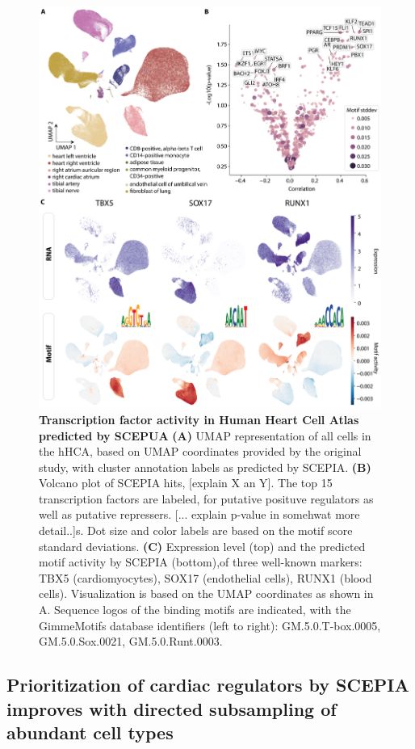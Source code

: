 \begin{figure}
    \centering
    \includegraphics[width=0.75\linewidth]{ch.scepia/imgs/SCEPIA_allCells_v10_Myriad_Figure3.png}
    \caption{\textbf{Transcription factor activity in Human Heart Cell Atlas predicted by SCEPUA} \textbf{(A)} UMAP representation of all cells in the hHCA, based on UMAP coordinates provided by the original study\cite{Kanemaru2023}, with cluster annotation labels as predicted by SCEPIA. \textbf{(B) }Volcano plot of SCEPIA hits, [explain X an Y]. The top 15 transcription factors are labeled, for putative posituve regulators as well as putative repressers. [... explain p-value in somehwat more detail..]s. Dot size and color labels are based on the motif score standard deviations.  \textbf{(C) }Expression level (top) and the predicted motif activity by SCEPIA (bottom),of three well-known markers: TBX5 (cardiomyocytes), SOX17 (endothelial cells), RUNX1 (blood cells). Visualization is based on the UMAP coordinates as shown in A. Sequence logos of the binding motifs are indicated, with the GimmeMotifs database identifiers (left to right): GM.5.0.T-box.0005, GM.5.0.Sox.0021, GM.5.0.Runt.0003. }
    \label{fig:scepia_hhca1}
\end{figure}


\subsection{Prioritization of cardiac regulators by SCEPIA improves with directed subsampling of abundant cell types}

